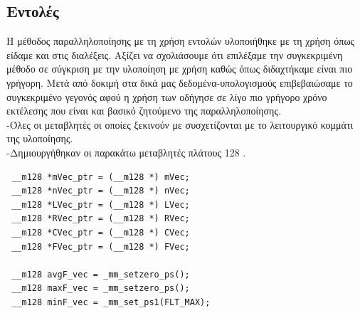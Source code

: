 \documentclass{article}
\begin{document}
\subsection{ Εντολές}

Η μέθοδος παραλληλοποίησης με τη χρήση  εντολών υλοποιήθηκε με τη χρήση  όπως είδαμε και στις διαλέξεις. Αξίζει να σχολιάσουμε ότι επιλέξαμε την συγκεκριμένη μέθοδο σε σύγκριση με την υλοποίηση με χρήση  καθώς όπως διδαχτήκαμε είναι πιο γρήγορη. Μετά από δοκιμή στα δικά μας δεδομένα-υπολογισμούς επιβεβαιώσαμε το συγκεκριμένο γεγονός αφού η χρήση των  οδήγησε σε λίγο πιο γρήγορο χρόνο εκτέλεσης που είναι και βασικό ζητούμενο της παραλληλοποίησης.\\
\newline
-Όλες οι μεταβλητές οι οποίες ξεκινούν με  συσχετίζονται με το λειτουργικό κομμάτι της  υλοποίησης.\\
-Δημιουργήθηκαν οι παρακάτω μεταβλητές πλάτους 128 .

\begin{lstlisting}
 __m128 *mVec_ptr = (__m128 *) mVec;
 __m128 *nVec_ptr = (__m128 *) nVec;
 __m128 *LVec_ptr = (__m128 *) LVec;
 __m128 *RVec_ptr = (__m128 *) RVec;
 __m128 *CVec_ptr = (__m128 *) CVec;
 __m128 *FVec_ptr = (__m128 *) FVec;

 __m128 avgF_vec = _mm_setzero_ps();
 __m128 maxF_vec = _mm_setzero_ps();
 __m128 minF_vec = _mm_set_ps1(FLT_MAX);
\end{lstlisting}

\end{document}
